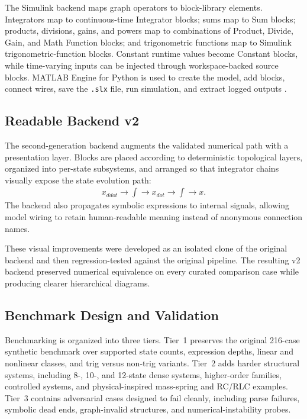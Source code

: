 \documentclass[colorlinks,upint,subscriptcorrection,varvw,balance,nofoot]{asmeconf}
\begin{document}
The Simulink backend maps graph operators to block-library elements. Integrators map to continuous-time Integrator blocks; sums map to Sum blocks; products, divisions, gains, and powers map to combinations of Product, Divide, Gain, and Math Function blocks; and trigonometric functions map to Simulink trigonometric-function blocks. Constant runtime values become Constant blocks, while time-varying inputs can be injected through workspace-backed source blocks. MATLAB Engine for Python is used to create the model, add blocks, connect wires, save the \texttt{.slx} file, run simulation, and extract logged outputs \cite{mathworks2025python}.

\subsection{Readable Backend v2}
The second-generation backend augments the validated numerical path with a presentation layer. Blocks are placed according to deterministic topological layers, organized into per-state subsystems, and arranged so that integrator chains visually expose the state evolution path:
\begin{align}
  x_{ddot} \rightarrow \int \rightarrow x_{dot} \rightarrow \int \rightarrow x.
\end{align}
The backend also propagates symbolic expressions to internal signals, allowing model wiring to retain human-readable meaning instead of anonymous connection names.

These visual improvements were developed as an isolated clone of the original backend and then regression-tested against the original pipeline. The resulting v2 backend preserved numerical equivalence on every curated comparison case while producing clearer hierarchical diagrams.

\subsection{Benchmark Design and Validation}
Benchmarking is organized into three tiers. Tier~1 preserves the original 216-case synthetic benchmark over supported state counts, expression depths, linear and nonlinear classes, and trig versus non-trig variants. Tier~2 adds harder structural systems, including 8-, 10-, and 12-state dense systems, higher-order families, controlled systems, and physical-inspired mass-spring and RC/RLC examples. Tier~3 contains adversarial cases designed to fail cleanly, including parse failures, symbolic dead ends, graph-invalid structures, and numerical-instability probes.
\end{document}
